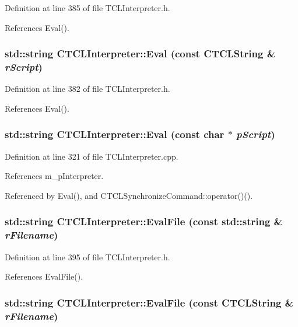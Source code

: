 Definition at line 385 of file TCLInterpreter.h.

References Eval().
\subsubsection{\setlength{\rightskip}{0pt plus 5cm}std::string CTCLInterpreter::Eval (const {\bf CTCLString} \& {\em r\-Script})\hspace{0.3cm}{\tt  [inline]}}\label{classCTCLInterpreter_a6}




Definition at line 382 of file TCLInterpreter.h.

References Eval().
\subsubsection{\setlength{\rightskip}{0pt plus 5cm}std::string CTCLInterpreter::Eval (const char $\ast$ {\em p\-Script})}\label{classCTCLInterpreter_a5}




Definition at line 321 of file TCLInterpreter.cpp.

References m\_\-p\-Interpreter.

Referenced by Eval(), and CTCLSynchronize\-Command::operator()().
\subsubsection{\setlength{\rightskip}{0pt plus 5cm}std::string CTCLInterpreter::Eval\-File (const std::string \& {\em r\-Filename})\hspace{0.3cm}{\tt  [inline]}}\label{classCTCLInterpreter_a10}




Definition at line 395 of file TCLInterpreter.h.

References Eval\-File().
\subsubsection{\setlength{\rightskip}{0pt plus 5cm}std::string CTCLInterpreter::Eval\-File (const {\bf CTCLString} \& {\em r\-Filename})\hspace{0.3cm}{\tt  [inline]}}\label{classCTCLInterpreter_a9}




